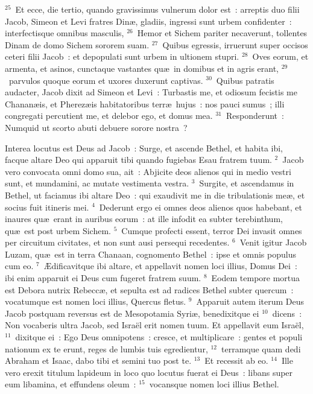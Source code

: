 ${}^{25}$~Et ecce, die tertio, quando gravissimus vulnerum dolor est~: arreptis duo filii Jacob, Simeon et Levi fratres Din\ae , gladiis, ingressi sunt urbem confidenter~: interfectisque omnibus masculis,
${}^{26}$~Hemor et Sichem pariter necaverunt, tollentes Dinam de domo Sichem sororem suam.
${}^{27}$~Quibus egressis, irruerunt super occisos ceteri filii Jacob~: et depopulati sunt urbem in ultionem stupri.
${}^{28}$~Oves eorum, et armenta, et asinos, cunctaque vastantes qu\ae\ in domibus et in agris erant,
${}^{29}$~parvulos quoque eorum et uxores duxerunt captivas.
${}^{30}$~Quibus patratis audacter, Jacob dixit ad Simeon et Levi~: Turbastis me, et odiosum fecistis me Chanan\ae is, et Pherez\ae is habitatoribus terr\ae\ hujus~: nos pauci sumus~; illi congregati percutient me, et delebor ego, et domus mea.
${}^{31}$~Responderunt~: Numquid ut scorto abuti debuere sorore nostra~?

\lettrine[lines=3,image=true,loversize=0.05,lraise=-0.03]{I}{}nterea locutus est Deus ad Jacob~: Surge, et ascende Bethel, et habita ibi, facque altare Deo qui apparuit tibi quando fugiebas Esau fratrem tuum.
${}^{2}$~Jacob vero convocata omni domo sua, ait~: Abjicite deos alienos qui in medio vestri sunt, et mundamini, ac mutate vestimenta vestra.
${}^{3}$~Surgite, et ascendamus in Bethel, ut faciamus ibi altare Deo~: qui exaudivit me in die tribulationis me\ae , et socius fuit itineris mei.
${}^{4}$~Dederunt ergo ei omnes deos alienos quos habebant, et inaures qu\ae\ erant in auribus eorum~: at ille infodit ea subter terebinthum, qu\ae\ est post urbem Sichem.
${}^{5}$~Cumque profecti essent, terror Dei invasit omnes per circuitum civitates, et non sunt ausi persequi recedentes.
${}^{6}$~Venit igitur Jacob Luzam, qu\ae\ est in terra Chanaan, cognomento Bethel~: ipse et omnis populus cum eo.
${}^{7}$~\AE dificavitque ibi altare, et appellavit nomen loci illius, Domus Dei~: ibi enim apparuit ei Deus cum fugeret fratrem suum.
${}^{8}$~Eodem tempore mortua est Debora nutrix Rebecc\ae , et sepulta est ad radices Bethel subter quercum~: vocatumque est nomen loci illius, Quercus fletus.
${}^{9}$~Apparuit autem iterum Deus Jacob postquam reversus est de Mesopotamia Syri\ae , benedixitque ei
${}^{10}$~dicens~: Non vocaberis ultra Jacob, sed Isra\"el erit nomen tuum. Et appellavit eum Isra\"el,
${}^{11}$~dixitque ei~: Ego Deus omnipotens~: cresce, et multiplicare~: gentes et populi nationum ex te erunt, reges de lumbis tuis egredientur,
${}^{12}$~terramque quam dedi Abraham et Isaac, dabo tibi et semini tuo post te.
${}^{13}$~Et recessit ab eo.
${}^{14}$~Ille vero erexit titulum lapideum in loco quo locutus fuerat ei Deus~: libans super eum libamina, et effundens oleum~:
${}^{15}$~vocansque nomen loci illius Bethel.



